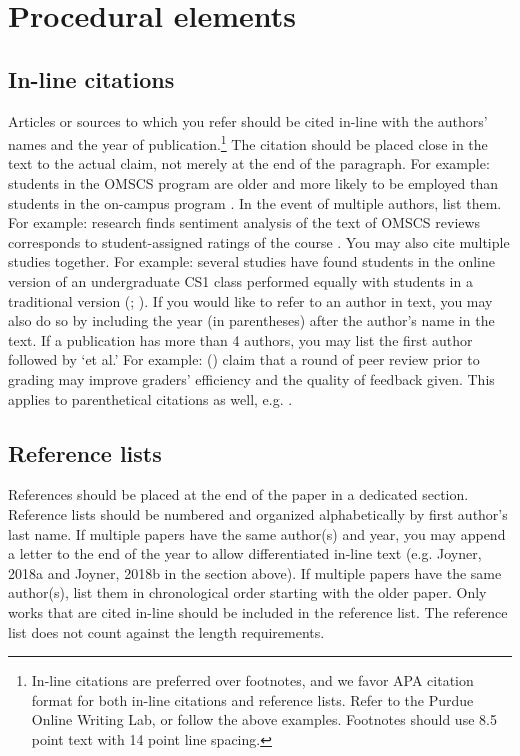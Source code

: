 \documentclass[
	letterpaper, %
]{jdf}
\begin{document}
\section{Procedural elements}
\subsection{In-line citations}
Articles or sources to which you refer should be cited in-line with the authors’ names and the year of publication.\footnote{In-line citations are preferred over footnotes, and we favor APA citation format for both in-line citations and reference lists. Refer to the Purdue Online Writing Lab, or follow the above examples. Footnotes should use 8.5 point text with 14 point line spacing.} The citation should be placed close in the text to the actual claim, not merely at the end of the paragraph. For example: students in the OMSCS program are older and more likely to be employed than students in the on-campus program \citep{joyner2017}. In the event of multiple authors, list them. For example: research finds sentiment analysis of the text of OMSCS reviews corresponds to student-assigned ratings of the course \citep{newman2018}. You may also cite multiple studies together. For example: several studies have found students in the online version of an undergraduate CS1 class performed equally with students in a traditional version (\cite{joyner2018a}; \cite{joyner2018b}). If you would like to refer to an author in text, you may also do so by including the year (in parentheses) after the author’s name in the text. If a publication has more than 4 authors, you may list the first author followed by ‘et al.’ For example: \citeauthor{joyner2016} (\citeyear{joyner2016}) claim that a round of peer review prior to grading may improve graders’ efficiency and the quality of feedback given. This applies to parenthetical citations as well, e.g. \citep{joyner2016}.

\subsection{Reference lists}
References should be placed at the end of the paper in a dedicated section. Reference lists should be numbered and organized alphabetically by first author’s last name. If multiple papers have the same author(s) and year, you may append a letter to the end of the year to allow differentiated in-line text (e.g. Joyner, 2018a and Joyner, 2018b in the section above). If multiple papers have the same author(s), list them in chronological order starting with the older paper. Only works that are cited in-line should be included in the reference list. The reference list does not count against the length requirements.
\end{document}
